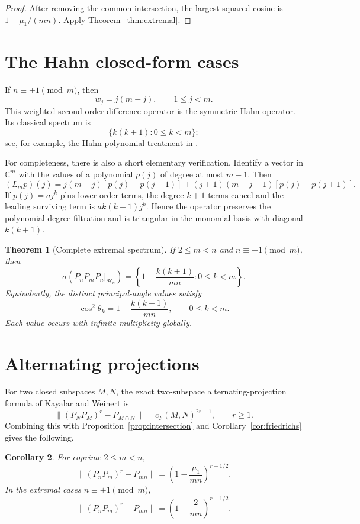 \documentclass[11pt]{article}
\newtheorem{theorem}{Theorem}[section]
\newtheorem{corollary}[theorem]{Corollary}
\theoremstyle{remark}
\newcommand{\spec}{\sigma}
\newcommand{\cF}{c_F}
\newcommand{\1}{\mathbf 1}
\begin{document}
\begin{proof}
After removing the common intersection, the largest squared cosine is
$1-\mu_1/(mn)$. Apply Theorem~\ref{thm:extremal}.
\end{proof}

\section{The Hahn closed-form cases}\label{sec:hahn}
If $n\equiv\pm1\pmod m$, then
\[
w_j=j(m-j),\qquad 1\le j<m.
\]
This weighted second-order difference operator is the symmetric Hahn
operator. Its classical spectrum is
\[
\{k(k+1):0\le k<m\};
\]
see, for example, the Hahn-polynomial treatment in
\cite{KoekoekLeskySwarttouw2010}.

For completeness, there is also a short elementary verification. Identify a
vector in $\mathbb C^m$ with the values of a polynomial $p(j)$ of degree at
most $m-1$. Then
\[
(L_mp)(j)=j(m-j)[p(j)-p(j-1)]
 +(j+1)(m-j-1)[p(j)-p(j+1)].
\]
If $p(j)=aj^k$ plus lower-order terms, the degree-$k+1$ terms cancel and the
leading surviving term is $ak(k+1)j^k$. Hence the operator preserves the
polynomial-degree filtration and is triangular in the monomial basis with
diagonal $k(k+1)$.

\begin{theorem}[Complete extremal spectrum]\label{thm:hahn}
If $2\le m<n$ and $n\equiv\pm1\pmod m$, then
\[
\spec(P_nP_mP_n|_{\mathcal H_n})
=\left\{1-\frac{k(k+1)}{mn}:0\le k<m\right\}.
\]
Equivalently, the distinct principal-angle values satisfy
\[
\cos^2\theta_k=1-\frac{k(k+1)}{mn},\qquad 0\le k<m.
\]
Each value occurs with infinite multiplicity globally.
\end{theorem}

\section{Alternating projections}
For two closed subspaces $M,N$, the exact two-subspace alternating-projection
formula of Kayalar and Weinert \cite{KayalarWeinert1988} is
\[
\|(P_NP_M)^r-P_{M\cap N}\|=\cF(M,N)^{2r-1},\qquad r\ge1.
\]
Combining this with Proposition~\ref{prop:intersection} and
Corollary~\ref{cor:friedrichs} gives the following.

\begin{corollary}
For coprime $2\le m<n$,
\[
\|(P_nP_m)^r-P_{mn}\|
=\left(1-\frac{\mu_1}{mn}\right)^{r-1/2}.
\]
In the extremal cases $n\equiv\pm1\pmod m$,
\[
\|(P_nP_m)^r-P_{mn}\|
=\left(1-\frac2{mn}\right)^{r-1/2}.
\]
\end{corollary}
\end{document}
